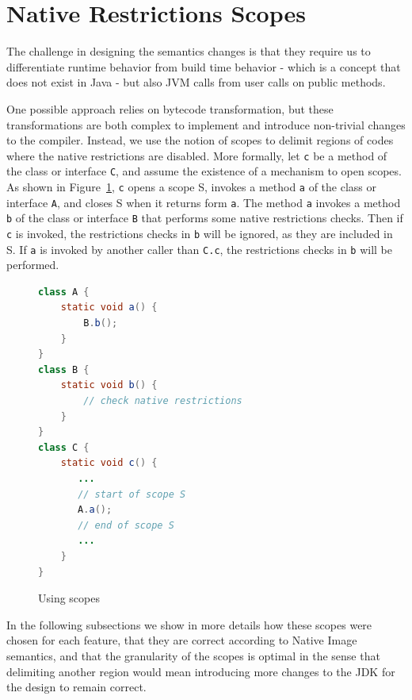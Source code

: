 \section{Native Restrictions Scopes}
The challenge in designing the semantics changes is that they require us to differentiate runtime behavior from build time behavior - which is a concept that does not exist in Java - but also JVM calls from user calls on public methods.

One possible approach relies on bytecode transformation, but these transformations are both complex to implement and introduce non-trivial changes to the compiler. 
Instead, we use the notion of scopes to delimit regions of codes where the native restrictions are disabled. 
More formally, let \verb|c| be a method of the class or interface \verb|C|, and assume the existence of a mechanism to open scopes. As shown in Figure~\ref{fig:scopes}, \verb|c| opens a scope S, invokes a method \verb|a| of the class or interface \verb|A|, and closes S when it returns form \verb|a|.
The method \verb|a| invokes a method \verb|b| of the class or interface \verb|B| that performs some native restrictions checks.
Then if \verb|c| is invoked, the restrictions checks in \verb|b| will be ignored, as they are included in S.
If \verb|a| is invoked by another caller than \verb|C.c|, the restrictions checks in \verb|b| will be performed.

\begin{figure}[ht]
    \centering
\begin{lstlisting}[language=Java]
class A {
    static void a() {
        B.b(); 
    }
} 
class B {
    static void b() {
        // check native restrictions
    }
}
class C {
    static void c() {
       ...
       // start of scope S
       A.a();
       // end of scope S
       ...
    }
}
\end{lstlisting}
    \caption{Using scopes}
    \label{fig:scopes}
\end{figure}


In the following subsections we show in more details how these scopes were chosen for each feature, that they are correct according to Native Image semantics, and that the granularity of the scopes is optimal in the sense that delimiting another region would mean introducing more changes to the JDK for the design to remain correct.

